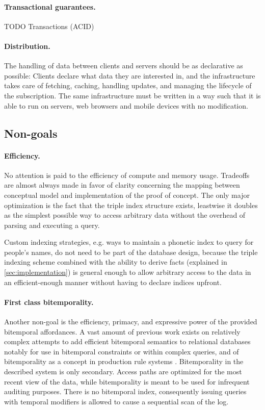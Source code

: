 \paragraph{Transactional guarantees.}
TODO Transactions (ACID)


\paragraph{Distribution.}
The handling of data between clients and servers should be as declarative as possible: Clients declare what data they are interested in, and the infrastructure takes care of fetching, caching, handling updates, and managing the lifecycle of the subscription. The same infrastructure must be written in a way such that it is able to run on servers, web browsers and mobile devices with no modification.


\subsection{Non-goals}\label{sec:nongoals}


\paragraph{Efficiency.}
No attention is paid to the efficiency of compute and memory usage. Tradeoffs are almost always made in favor of clarity concerning the mapping between conceptual model and implementation of the proof of concept. The only major optimization is the fact that the triple index structure exists, leastwise it doubles as the simplest possible way to access arbitrary data without the overhead of parsing and executing a query.

Custom indexing strategies, e.g. ways to maintain a phonetic index to query for people's names, do not need to be part of the database design, because the triple indexing scheme combined with the ability to derive facts (explained in \autoref{sec:implementation}) is general enough to allow arbitrary access to the data in an efficient-enough manner without having to declare indices upfront.

\paragraph{First class bitemporality.}
Another non-goal is the efficiency, primacy, and expressive power of the provided bitemporal affordances. A vast amount of previous work exists on relatively complex attempts to add efficient bitemporal semantics to relational databases \cite{snodgrass1996adding,jensen1999temporal,kulkarni2012temporal} notably for use in bitemporal constraints \cite{doucet1997using} or within complex queries, and of bitemporality as a concept in production rule systems \cite{aref2015design}. Bitemporality in the described system is only secondary. Access paths are optimized for the most recent view of the data, while bitemporality is meant to be used for infrequent auditing purposes. There is no bitemporal index, consequently issuing queries with temporal modifiers is allowed to cause a sequential scan of the log.

